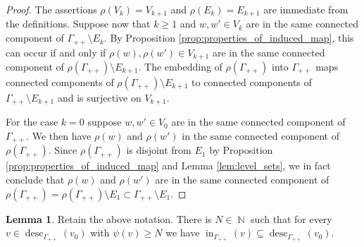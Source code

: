 \documentclass{article}
\DeclareMathOperator\desc{desc}
\DeclareMathOperator\bbN{\mathbb{N}}
\theoremstyle{definition}
\newtheorem{lemma}[theorem]{Lemma}
\begin{document}
\begin{proof}
The assertions $\rho(V_k) = V_{k+1}$ and $\rho(E_k) = E_{k+1}$ are immediate from the definitions. Suppose now that $k\ge 1$ and $w,w'\in V_{k}$ are in the same connected component of $\Gamma_{++}\setminus E_{k}$. By Proposition \ref{prop:properties_of_induced_map}, this can occur if and only if $\rho(w),\rho(w')\in V_{k+1}$ are in the same connected component of $\rho(\Gamma_{++})\setminus E_{k+1}$. The embedding of $\rho(\Gamma_{++})$ into $\Gamma_{++}$ maps connected components of $\rho(\Gamma_{++})\!\setminus\! E_{k+1}$ to connected components of $\Gamma_{++}\!\setminus E_{k+1}$ and is surjective on $V_{k+1}$.

For the case $k = 0$ suppose $w,w'\in V_0$ are in the same connected component of $\Gamma_{++}$. We then have $\rho(w)$ and $\rho(w')$ in the same connected component of $\rho(\Gamma_{++})$. Since $\rho(\Gamma_{++})$ is disjoint from $E_1$ by Proposition \ref{prop:properties_of_induced_map} and Lemma \ref{lem:level_sets}, we in fact conclude that $\rho(w)$ and $\rho(w')$ are in the same connected component of $\rho(\Gamma_{++}) = \rho(\Gamma_{++})\setminus E_1\subset \Gamma_{++}\setminus E_1$.
\end{proof}

\begin{lemma}\label{lem:in_vertices_in_descendants_of_root}
Retain the above notation. There is $N\in\bbN$ such that for every $v\in\desc_{\Gamma_{++}}(v_{0})$ with $\psi(v)\ge N$ we have $\operatorname{in}_{\Gamma_{++}}(v)\subseteq \desc_{\Gamma_{++}}(v_0)$. 
\end{lemma}
\end{document}
